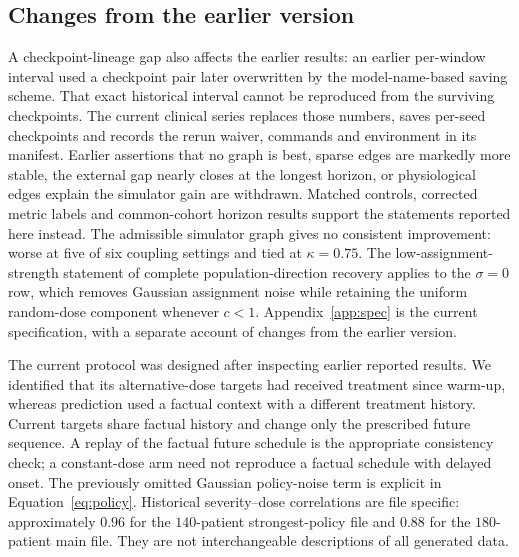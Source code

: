 \subsection{Changes from the earlier version}
A checkpoint-lineage gap also affects the earlier results: an earlier per-window interval used a checkpoint pair later overwritten by the model-name-based saving scheme. That exact historical interval cannot be reproduced from the surviving checkpoints. The current clinical series replaces those numbers, saves per-seed checkpoints and records the rerun waiver, commands and environment in its manifest. Earlier assertions that no graph is best, sparse edges are markedly more stable, the external gap nearly closes at the longest horizon, or physiological edges explain the simulator gain are withdrawn. Matched controls, corrected metric labels and common-cohort horizon results support the statements reported here instead. The admissible simulator graph gives no consistent improvement: worse at five of six coupling settings and tied at $\kappa=0.75$. The low-assignment-strength statement of complete population-direction recovery applies to the $\sigma=0$ row, which removes Gaussian assignment noise while retaining the uniform random-dose component whenever $c<1$. Appendix~\ref{app:spec} is the current specification, with a separate account of changes from the earlier version.

The current protocol was designed after inspecting earlier reported results. We identified that its alternative-dose targets had received treatment since warm-up, whereas prediction used a factual context with a different treatment history. Current targets share factual history and change only the prescribed future sequence. A replay of the factual future schedule is the appropriate consistency check; a constant-dose arm need not reproduce a factual schedule with delayed onset. The previously omitted Gaussian policy-noise term is explicit in Equation~\ref{eq:policy}. Historical severity--dose correlations are file specific: approximately $0.96$ for the $140$-patient strongest-policy file and $0.88$ for the $180$-patient main file. They are not interchangeable descriptions of all generated data.

